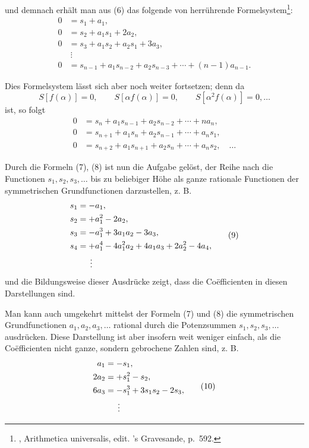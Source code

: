 
und demnach erhält man aus (6) das folgende von  herrührende Formelsystem\footnote[1]{, Arithmetica universalis, edit. 's Gravesande, p.~592.}:
\begin{equation}
\begin{aligned}
0&=s_1+a_1,\\
0&=s_2+a_1s_1+2a_2,\\
0&=s_3+a_1s_2+a_2s_1+3a_3,\\
&\ \vdots\\
0&=s_{n-1}+a_1s_{n-2}+a_2s_{n-3}+\cdots+(n-1)a_{n-1}.
\end{aligned}
\tag{7}
\end{equation}

Dies Formelsystem lässt sich aber noch weiter fortsetzen; denn da
\[
 S[f(\alpha)]=0,\qquad S[\alpha f(\alpha)]=0,\qquad S[\alpha^2 f(\alpha)]=0,\ldots
\]
ist, so folgt
\begin{equation}
\begin{aligned}
0&=s_n+a_1s_{n-1}+a_2s_{n-2}+\cdots+n a_n,\\
0&=s_{n+1}+a_1s_n+a_2s_{n-1}+\cdots+a_ns_1,\\
0&=s_{n+2}+a_1s_{n+1}+a_2s_n+\cdots+a_ns_2,\quad\ldots
\end{aligned}
\tag{8}
\end{equation}

Durch die Formeln (7), (8) ist nun die Aufgabe gelöst, der Reihe nach die Functionen $s_1,s_2,s_3,\ldots$ bis zu beliebiger Höhe als ganze rationale Functionen der symmetrischen Grundfunctionen darzustellen, z. B.
\begin{equation}
\begin{aligned}
 s_1&=-a_1,\\
 s_2&=+a_1^2-2a_2,\\
 s_3&=-a_1^3+3a_1a_2-3a_3,\\
 s_4&=+a_1^4-4a_1^2a_2+4a_1a_3+2a_2^2-4a_4,\\
 &\hspace{1.5em}\vdots
\end{aligned}
\tag{9}
\end{equation}
und die Bildungsweise dieser Ausdrücke zeigt, dass die Coëfficienten in diesen Darstellungen  sind.

Man kann auch umgekehrt mittelst der Formeln (7) und (8) die symmetrischen Grundfunctionen $a_1,a_2,a_3,\ldots$ rational durch die Potenzsummen $s_1,s_2,s_3,\ldots$ ausdrücken. Diese Darstellung ist aber insofern weit weniger einfach, als die Coëfficienten nicht ganze, sondern gebrochene Zahlen sind, z. B.
\begin{equation}
\begin{aligned}
 a_1&=-s_1,\\
 2a_2&=+s_1^2-s_2,\\
 6a_3&=-s_1^3+3s_1s_2-2s_3,\\
 &\hspace{1.5em}\vdots
\end{aligned}
\tag{10}
\end{equation}
